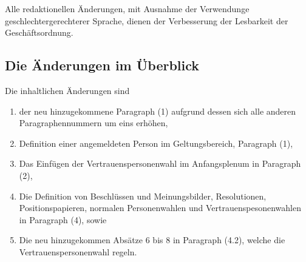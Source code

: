 \documentclass[draft,12pt,oneside]{scrartcl}
\begin{document}
Alle redaktionellen Änderungen, mit Ausnahme der Verwendunge geschlechtergerechterer Sprache,
dienen der Verbesserung der Lesbarkeit der Geschäftsordnung.

\subsection*{Die Änderungen im Überblick}

Die inhaltlichen Änderungen sind
\begin{enumerate}
\item der neu hinzugekommene Paragraph (1) aufgrund dessen sich alle anderen Paragraphennummern
      um eins erhöhen,
\item Definition einer angemeldeten Person im Geltungsbereich, Paragraph (1),
\item Das Einfügen der Vertrauenspersonenwahl im Anfangsplenum in Paragraph (2),
\item Die Definition von Beschlüssen und Meinungsbilder, Resolutionen, Positionspapieren,
      normalen Personenwahlen und Vertrauenspesonenwahlen in Paragraph (4), sowie
\item Die neu hinzugekommen Absätze 6 bis 8 in Paragraph (4.2), welche die Vertrauenspersonenwahl
      regeln.
\end{enumerate}
\end{document}

